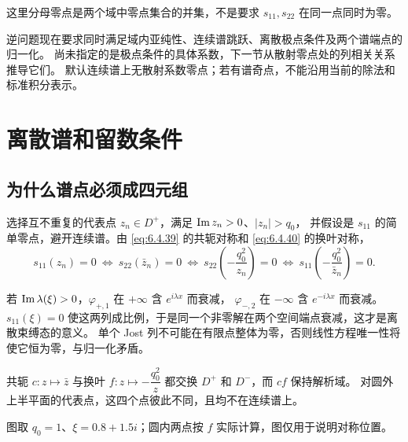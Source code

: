 \documentclass[lang=cn,scheme=chinese,mode=simple,device=normal,color=blue,
math=cm,thmcnt=section,12pt]{elegantbook}
\newcommand{\eqq}[2]{\tag{#1}\label{eq:#1}#2}
\begin{document}
这里分母零点是两个域中零点集合的并集，不是要求 $s_{11},s_{22}$ 在同一点同时为零。




\begin{callout}
    逆问题现在要求同时满足域内亚纯性、连续谱跳跃、离散极点条件及两个谱端点的归一化。
    尚未指定的是极点条件的具体系数，下一节从散射零点处的列相关关系推导它们。
    默认连续谱上无散射系数零点；若有谱奇点，不能沿用当前的除法和标准积分表示。
\end{callout}

\section{离散谱和留数条件}
\subsection{为什么谱点必须成四元组}
选择互不重复的代表点 $z_n\in D^+$，满足 $\operatorname{Im} z_n>0$、$|z_n|>q_0$，
并假设是 $s_{11}$ 的简单零点，避开连续谱。由 \eqref{eq:6.4.39} 的共轭对称和 \eqref{eq:6.4.40} 的换叶对称，
\begin{equation}\eqq{6.6.1}{s_{11}(z_n)=0\ \Longleftrightarrow\ s_{22}(\bar z_n)=0
        \ \Longleftrightarrow\ s_{22}(-\dfrac{q_0^2}{z_n})=0
        \ \Longleftrightarrow\ s_{11}(-\dfrac{q_0^2}{\bar z_n})=0.}\end{equation}

\begin{callout}
    若 $\operatorname{Im}\lambda(\xi)>0$，$\varphi_{+,1}$ 在 $+\infty$ 含 $e^{i\lambda x}$ 而衰减，
    $\varphi_{-,2}$ 在 $-\infty$ 含 $e^{-i\lambda x}$ 而衰减。
    $s_{11}(\xi)=0$ 使这两列成比例，于是同一个非零解在两个空间端点衰减，这才是离散束缚态的意义。
    单个 Jost 列不可能在有限点整体为零，否则线性方程唯一性将使它恒为零，与归一化矛盾。

    共轭 $c:z\mapsto\bar z$ 与换叶 $f:z\mapsto-\dfrac{q_0^2}{z}$ 都交换 $D^+$ 和 $D^-$，而 $cf$ 保持解析域。
    对圆外上半平面的代表点，这四个点彼此不同，且均不在连续谱上。
    \begin{center}
    \end{center}
    图取 $q_0=1$、$\xi=0.8+1.5i$；圆内两点按 $f$ 实际计算，图仅用于说明对称位置。
\end{callout}
\end{document}
